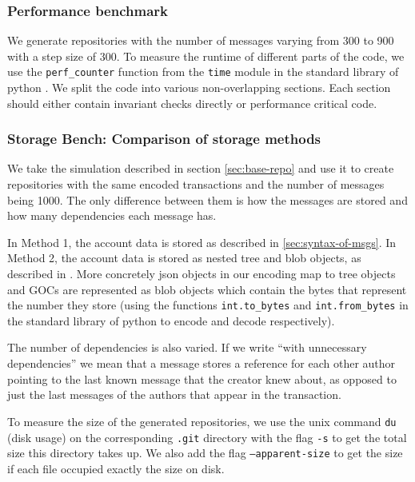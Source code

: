 \documentclass{article}
\begin{document}
\subsubsection{Performance benchmark}
We generate repositories with the number of messages varying from 300 to 900 with a step size of 300.
To measure the runtime of different parts of the code, we use the \verb|perf_counter| function from the \verb|time| module in the standard library of python \cite{pythonPerfCounterNs}.
We split the code into various non-overlapping sections. Each section should either contain invariant checks directly or performance critical code.

\subsubsection{Storage Bench: Comparison of storage methods}
We take the simulation described in section \ref{sec:base-repo} and use it to create repositories with the same encoded transactions and the number of messages being 1000. The only difference between them is how the messages are stored and how many dependencies each message has.

In Method 1, the account data is stored as described in \ref{sec:syntax-of-msgs}. In Method 2, the account data is stored as nested tree and blob objects, as described in \cite{delta-goc-ledger-heisch}. More concretely json objects in our encoding map to tree objects and GOCs are represented as blob objects which contain the bytes that represent the number they store (using the functions \verb|int.to_bytes| and \verb|int.from_bytes| in the standard library of python to encode and decode respectively). 

The number of dependencies is also varied. If we write ``with unnecessary dependencies'' we mean that a message stores a reference for each other author pointing to the last known message that the creator knew about, as opposed to just the last messages of the authors that appear in the transaction.

To measure the size of the generated repositories, we use the unix command \texttt{du} (disk usage) on the corresponding \texttt{.git} directory with the flag \texttt{-s} to get the total size this directory takes up. We also add the flag \texttt{--apparent-size} to get the size if each file occupied exactly the size on disk.
\end{document}
